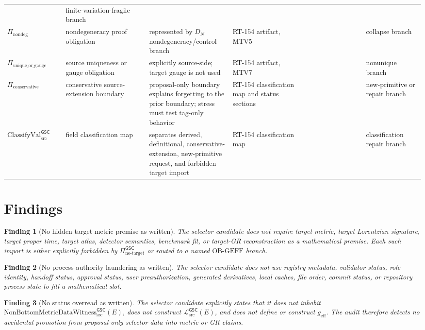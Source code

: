 \documentclass[11pt]{article}
\newcommand{\ClassVal}{\mathrm{ClassifyVal}_{\mathrm{src}}^{\mathsf{GSC}}}
\newcommand{\NoTarget}{\Pi_{\mathrm{no\mbox{-}target}}^{\mathsf{GSC}}}
\newcommand{\MetricData}{\mathcal{L}_{\mathrm{src}}^{\mathsf{GSC}}}
\newcommand{\Witness}{\mathrm{NonBottomMetricDataWitness}_{\mathrm{src}}^{\mathsf{GSC}}}
\newcommand{\geff}{g_{\mathrm{eff}}}
\newcommand{\Pass}{\mathrm{pass\_no\_smuggling\_detected}}
\newtheorem{finding}{Finding}
\begin{document}
\begin{longtable}{p{0.14\linewidth}p{0.20\linewidth}p{0.20\linewidth}p{0.18\linewidth}p{0.14\linewidth}p{0.14\linewidth}}
\Pass &
finite-variation-fragile branch \\
\(\Pi_{\mathrm{nondeg}}\) &
nondegeneracy proof obligation &
represented by \(D_N\) nondegeneracy/control branch &
RT-154 artifact, MTV5 &
\Pass &
collapse branch \\
\(\Pi_{\mathrm{unique\_or\_gauge}}\) &
source uniqueness or gauge obligation &
explicitly source-side; target gauge is not used &
RT-154 artifact, MTV7 &
\Pass &
nonunique branch \\
\(\Pi_{\mathrm{conservative}}\) &
conservative source-extension boundary &
proposal-only boundary explains forgetting to the prior boundary; stress must test tag-only behavior &
RT-154 classification map and status sections &
\Pass &
new-primitive or repair branch \\
\(\ClassVal\) &
field classification map &
separates derived, definitional, conservative-extension, new-primitive request, and forbidden target import &
RT-154 classification map &
\Pass &
classification repair branch \\
\bottomrule
\end{longtable}

\section{Findings}

\begin{finding}[No hidden target metric premise as written]
The selector candidate does not require target metric, target Lorentzian
signature, target proper time, target atlas, detector semantics, benchmark
fit, or target-GR reconstruction as a mathematical premise. Each such import
is either explicitly forbidden by \(\NoTarget\) or routed to a named
\(\mathrm{OB\mbox{-}GEFF}\) branch.
\end{finding}

\begin{finding}[No process-authority laundering as written]
The selector candidate does not use registry metadata, validator status, role
identity, handoff status, approval status, user preauthorization, generated
derivatives, local caches, file order, commit status, or repository process
state to fill a mathematical slot.
\end{finding}

\begin{finding}[No status overread as written]
The selector candidate explicitly states that it does not inhabit
\(\Witness(E)\), does not construct \(\MetricData(E)\), and does not define or
construct \(\geff\). The audit therefore detects no accidental promotion from
proposal-only selector data into metric or GR claims.
\end{finding}
\end{document}
